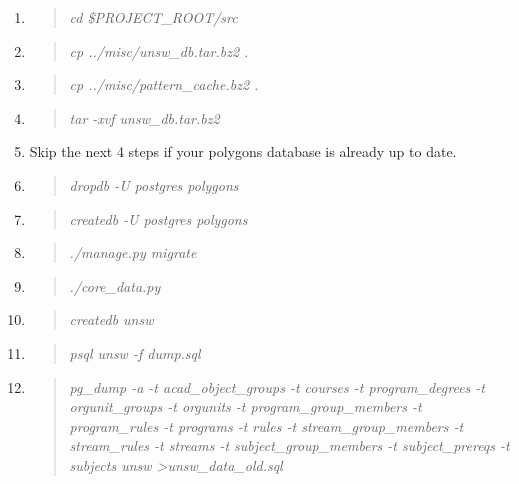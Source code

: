 \documentclass[12pt]{article}
\newenvironment{command}
   { 
      \begin{quote}\itshape
      \color{blue}
   }
   { \end{quote} }
\begin{document}
\begin{enumerate}
   \item \begin{command} cd \$PROJECT\_ROOT/src \end{command}
   \item \begin{command} cp ../misc/unsw\_db.tar.bz2 . \end{command}
   \item \begin{command} cp ../misc/pattern\_cache.bz2 . \end{command}
   \item \begin{command} tar -xvf unsw\_db.tar.bz2 \end{command}
   \item Skip the next 4 steps if your polygons database is already up to date.
   \item \begin{command} dropdb -U postgres polygons \end{command}
   \item \begin{command} createdb -U postgres polygons \end{command}
   \item \begin{command} ./manage.py migrate \end{command}
   \item \begin{command} ./core\_data.py \end{command}
   \item \begin{command} createdb unsw \end{command}
   \item \begin{command} psql unsw -f dump.sql \end{command}
   \item \begin{command} pg\_dump -a -t acad\_object\_groups -t courses -t
                         program\_degrees -t orgunit\_groups -t orgunits -t
                         program\_group\_members -t program\_rules -t programs
                         -t rules -t stream\_group\_members -t stream\_rules -t
                         streams -t subject\_group\_members -t subject\_prereqs
                         -t subjects unsw \textgreater unsw\_data\_old.sql \end{command}

\end{enumerate}
\end{document}

